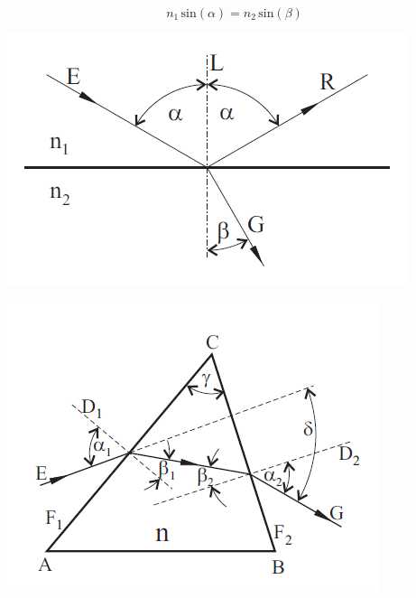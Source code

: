 \documentclass[11pt,ngerman]{scrartcl}
\begin{document}
\begin{equation}
	n_1 \,\textrm{sin}(\alpha) = n_2 \,\textrm{sin}(\beta)
\end{equation}

\begin{minipage}{\textwidth}
	\begin{minipage}[t]{0.5\textwidth}
		\centering
		\includegraphics[width=\textwidth]{abb_1}
		\label{fig:abb_1}
	\end{minipage}
	\vspace{2mm}
	\begin{minipage}[t]{0.50\textwidth}
		\centering
		\includegraphics[width=\textwidth]{abb_2}
		\label{fig:abb_2}
	\end{minipage}
	\vspace{1em}
\end{minipage}
\end{document}
